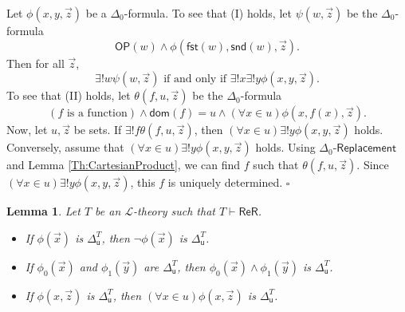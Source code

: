 \documentclass[11pt, a4paper]{article}
\newcounter{Prop1}
\newtheorem{lemma}[theorem]{Lemma}
\newenvironment{proof}[1][Proof]{\begin{trivlist}
\item[\hskip \labelsep {\bfseries #1}]}{\end{trivlist}}
\begin{document}
\begin{proof}
Let $\phi(x, y, \vec{z})$ be a $\Delta_0$-formula. To see that (I) holds, let $\psi(w, \vec{z})$ be the $\Delta_0$-formula
\[
\mathsf{OP}(w) \land \phi(\mathsf{fst}(w), \mathsf{snd}(w), \vec{z}).
\]
Then for all $\vec{z}$, 
\[
\exists! w \psi(w, \vec{z}) \textrm{ if and only if } \exists! x \exists! y \phi(x, y, \vec{z}).
\]
To see that (II) holds, let $\theta(f, u, \vec{z})$ be the $\Delta_0$-formula
\[
(f \textrm{ is a function}) \land \mathsf{dom}(f)=u \land (\forall  x \in u) \phi(x, f(x), \vec{z}).
\]
Now, let $u, \vec{z}$ be sets. If $\exists! f \theta(f, u, \vec{z})$, then $(\forall x \in u) \exists! y \phi(x, y, \vec{z})$ holds. Conversely, assume that $(\forall x \in u) \exists! y \phi(x, y, \vec{z})$ holds. Using $\Delta_0\textsf{-Replacement}$ and Lemma \ref{Th:CartesianProduct}, we can find $f$ such that $\theta(f, u, \vec{z})$. Since $(\forall x \in u) \exists! y \phi(x, y, \vec{z})$, this $f$ is uniquely determined. \hfill$\square$  
\end{proof}

\begin{lemma} \label{Th:ClosurePropertiesDeltaU}
Let $T$ be an $\mathcal{L}$-theory such that $T \vdash \mathsf{ReR}$. 
\begin{itemize}
\item[(I)] If $\phi(\vec{x})$ is $\Delta_{\mathsf{u}}^T$, then $\neg \phi(\vec{x})$ is $\Delta_{\mathsf{u}}^T$.
\item[(II)] If $\phi_0(\vec{x})$ and $\phi_1(\vec{y})$ are $\Delta_{\mathsf{u}}^T$, then $\phi_0(\vec{x}) \land \phi_1(\vec{y})$  is $\Delta_{\mathsf{u}}^T$.
\item[(III)] If $\phi(x, \vec{z})$ is $\Delta_{\mathsf{u}}^T$, then $(\forall x \in u)\phi(x, \vec{z})$ is $\Delta_{\mathsf{u}}^T$.  
\end{itemize}
\end{lemma}
\end{document}
